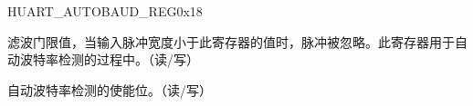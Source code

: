 \begin{register}{H}{UART\_AUTOBAUD\_REG}{0x18}\label{regdesc:UARTAUTOBAUDREG}
%
%
%
%
\regnewline%
\begin{regdesc}\begin{reglist}
\item [UART\_GLITCH\_FILT] 滤波门限值，当输入脉冲宽度小于此寄存器的值时，脉冲被忽略。此寄存器用于自动波特率检测的过程中。（读/写）
\item [UART\_AUTOBAUD\_EN] 自动波特率检测的使能位。（读/写）
\end{reglist}\end{regdesc}
\end{register}


